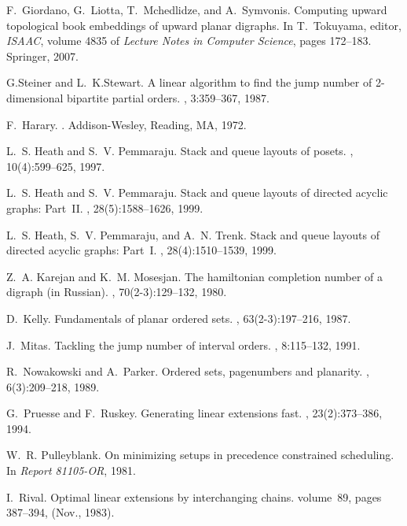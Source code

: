 \documentclass{myllncs-mixalis}
\begin{document}
\begin{thebibliography}{10}
F.~Giordano, G.~Liotta, T.~Mchedlidze, and A.~Symvonis.
\newblock Computing upward topological book embeddings of upward planar
  digraphs.
\newblock In T.~Tokuyama, editor, {\em ISAAC}, volume 4835 of {\em Lecture
  Notes in Computer Science}, pages 172--183. Springer, 2007.

G.Steiner and L.~K.Stewart.
\newblock A linear algorithm to find the jump number of 2-dimensional bipartite
  partial orders.
, 3:359--367, 1987.

F.~Harary.
.
\newblock Addison-Wesley, Reading, MA, 1972.

L.~S. Heath and S.~V. Pemmaraju.
\newblock Stack and queue layouts of posets.
, 10(4):599--625, 1997.

L.~S. Heath and S.~V. Pemmaraju.
\newblock Stack and queue layouts of directed acyclic graphs: Part~{II}.
, 28(5):1588--1626, 1999.

L.~S. Heath, S.~V. Pemmaraju, and A.~N. Trenk.
\newblock Stack and queue layouts of directed acyclic graphs: Part~{I}.
, 28(4):1510--1539, 1999.

Z.~A. Karejan and K.~M. Mosesjan.
\newblock The hamiltonian completion number of a digraph (in {R}ussian).
, 70(2-3):129--132, 1980.

D.~Kelly.
\newblock Fundamentals of planar ordered sets.
, 63(2-3):197--216, 1987.

J.~Mitas.
\newblock Tackling the jump number of interval orders.
, 8:115--132, 1991.

R.~Nowakowski and A.~Parker.
\newblock Ordered sets, pagenumbers and planarity.
, 6(3):209--218, 1989.

G.~Pruesse and F.~Ruskey.
\newblock Generating linear extensions fast.
, 23(2):373--386, 1994.

W.~R. Pulleyblank.
\newblock On minimizing setups in precedence constrained scheduling.
\newblock In {\em Report 81105-OR}, 1981.

I.~Rival.
\newblock Optimal linear extensions by interchanging chains.
\newblock volume~89, pages 387--394, (Nov., 1983).


\end{thebibliography}
\end{document}
